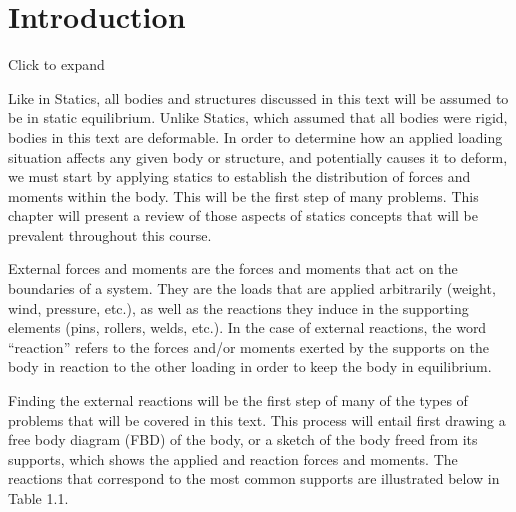 \documentclass[
  letterpaper,
  DIV=11,
  numbers=noendperiod]{scrreprt}
\theoremstyle{definition}
\theoremstyle{remark}
\begin{document}
\section*{Introduction}\label{introduction}


Click to expand

Like in Statics, all bodies and structures discussed in this text will
be assumed to be in static equilibrium. Unlike Statics, which assumed
that all bodies were rigid, bodies in this text are deformable. In order
to determine how an applied loading situation affects any given body or
structure, and potentially causes it to deform, we must start by
applying statics to establish the distribution of forces and moments
within the body. This will be the first step of many problems. This
chapter will present a review of those aspects of statics concepts that
will be prevalent throughout this course.

External forces and moments are the forces and moments that act on the
boundaries of a system. They are the loads that are applied arbitrarily
(weight, wind, pressure, etc.), as well as the reactions they induce in
the supporting elements (pins, rollers, welds, etc.). In the case of
external reactions, the word ``reaction'' refers to the forces and/or
moments exerted by the supports on the body in reaction to the other
loading in order to keep the body in equilibrium.

Finding the external reactions will be the first step of many of the
types of problems that will be covered in this text. This process will
entail first drawing a free body diagram (FBD) of the body, or a sketch
of the body freed from its supports, which shows the applied and
reaction forces and moments. The reactions that correspond to the most
common supports are illustrated below in Table 1.1.
\end{document}

